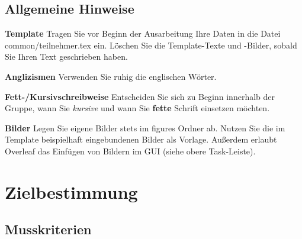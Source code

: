 \section{Allgemeine Hinweise}
\textbf{Template} Tragen Sie vor Beginn der Ausarbeitung Ihre Daten in die Datei common/teilnehmer.tex ein. Löschen Sie die Template-Texte und -Bilder, sobald Sie Ihren Text geschrieben haben.

\textbf{Anglizismen} Verwenden Sie ruhig die englischen Wörter.

\textbf{Fett-/Kursivschreibweise} Entscheiden Sie sich zu Beginn innerhalb der Gruppe, wann Sie \textit{kursive} und wann Sie \textbf{fette} Schrift einsetzen möchten.

\textbf{Bilder} Legen Sie eigene Bilder stets im figures Ordner ab. Nutzen Sie die im Template beispielhaft eingebundenen Bilder als Vorlage. Außerdem erlaubt Overleaf das Einfügen von Bildern im GUI (siehe obere Task-Leiste).


\chapter{Zielbestimmung}
\label{chap:target}

\section{Musskriterien}\label{sec:musskriterien}


